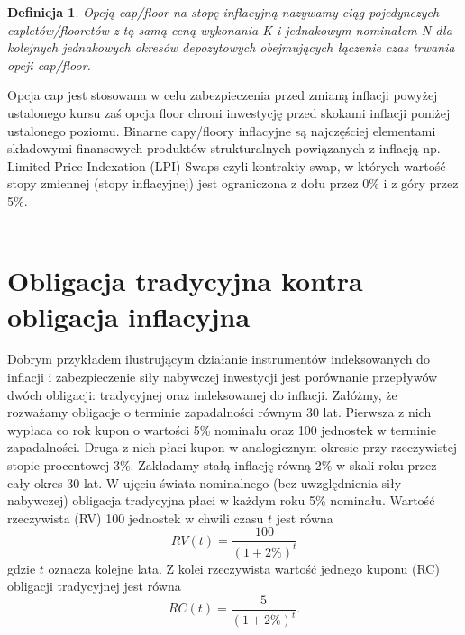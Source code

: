 \documentclass{mini}
\theoremstyle{mythstyle}
\newtheorem{Definicja}{Definicja}[chapter]
\begin{document}
	\begin{Definicja}
		Opcją cap/floor na stopę inflacyjną nazywamy ciąg pojedynczych capletów/flooretów z tą samą ceną wykonania K i jednakowym nominałem N dla kolejnych jednakowych okresów depozytowych obejmujących łączenie czas trwania opcji cap/floor.
	\end{Definicja}

	Opcja cap jest stosowana w celu zabezpieczenia przed zmianą inflacji powyżej ustalonego kursu zaś opcja floor chroni inwestycję przed skokami inflacji poniżej ustalonego poziomu. Binarne capy/floory inflacyjne są najczęściej elementami składowymi finansowych produktów strukturalnych powiązanych z inflacją np. Limited Price Indexation (LPI) Swaps czyli kontrakty swap, w których wartość stopy zmiennej (stopy inflacyjnej) jest ograniczona z dołu przez 0\% i z góry przez 5\%.\\\\
	
	\section{Obligacja tradycyjna kontra obligacja inflacyjna}
	
	Dobrym przykładem ilustrującym działanie instrumentów indeksowanych do inflacji i zabezpieczenie siły nabywczej inwestycji jest porównanie przepływów dwóch obligacji: tradycyjnej oraz indeksowanej do inflacji. Załóżmy, że rozważamy obligacje o terminie zapadalności równym 30 lat. Pierwsza z nich wypłaca co rok kupon o wartości 5\% nominału oraz 100 jednostek w terminie zapadalności. Druga z nich płaci kupon w analogicznym okresie przy rzeczywistej stopie procentowej 3\%. Zakładamy stałą inflację równą 2\% w skali roku przez cały okres 30 lat.
	W ujęciu świata nominalnego (bez uwzględnienia siły nabywczej) obligacja tradycyjna płaci w każdym roku 5\% nominału. Wartość rzeczywista (RV) 100 jednostek w chwili czasu $t$ jest równa
	\begin{equation*}
		RV(t) = \frac{100}{(1+2\%)^t}
	\end{equation*}
	gdzie $t$ oznacza kolejne lata. Z kolei rzeczywista wartość jednego kuponu (RC) obligacji tradycyjnej jest równa
	\begin{equation*}
	RC(t) = \frac{5}{(1+2\%)^t}.
	\end{equation*}
	
\end{document}
